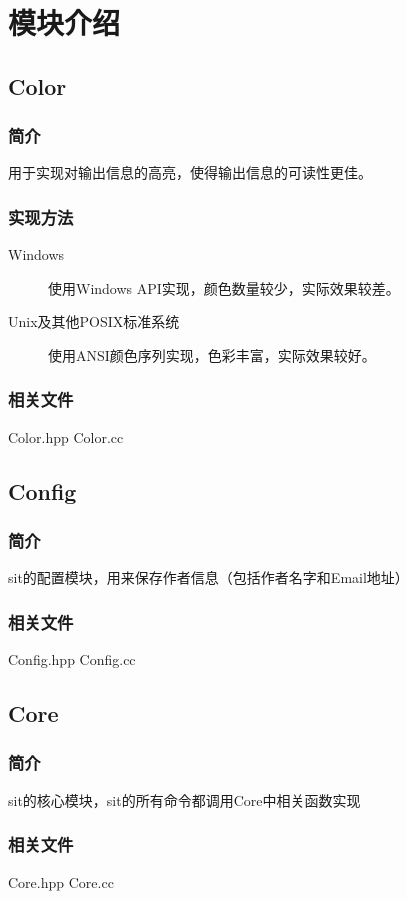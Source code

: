 \documentclass[11pt, a4paper, UTF8]{ctexart}
\begin{document}
\section{模块介绍}

\subsection{Color}
\subsubsection{简介}
用于实现对输出信息的高亮，使得输出信息的可读性更佳。
\subsubsection{实现方法}
\begin{description}
	\item[Windows] 使用Windows API实现，颜色数量较少，实际效果较差。
	\item[Unix及其他POSIX标准系统] 使用ANSI颜色序列实现，色彩丰富，实际效果较好。
\end{description}
\subsubsection{相关文件}
Color.hpp Color.cc

\subsection{Config}
\subsubsection{简介}
sit的配置模块，用来保存作者信息（包括作者名字和Email地址）
\subsubsection{相关文件}
Config.hpp Config.cc
\subsection{Core}
\subsubsection{简介}
sit的核心模块，sit的所有命令都调用Core中相关函数实现
\subsubsection{相关文件}
Core.hpp Core.cc
\end{document}
